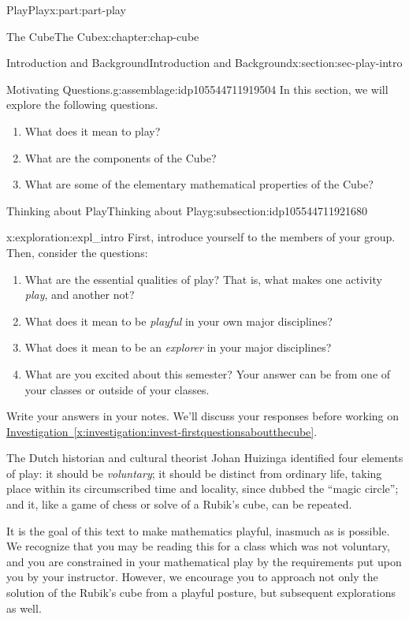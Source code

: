 \documentclass[oneside,10pt,]{book}
\newcommand{\xreffont}{\relax}
\numberwithin{equation}{section}
\begin{document}
\begin{partptx}{Play}{}{Play}{}{}{x:part:part-play}
\begin{chapterptx}{The Cube}{}{The Cube}{}{}{x:chapter:chap-cube}
\begin{sectionptx}{Introduction and Background}{}{Introduction and Background}{}{}{x:section:sec-play-intro}
\begin{introduction}{}
\begin{assemblage}{Motivating Questions.}{g:assemblage:idp105544711919504}%
In this section, we will explore the following questions. %
\begin{enumerate}
\item{}What does it mean to play?%
\item{}What are the components of the Cube?%
\item{}What are some of the elementary mathematical properties of the Cube?%
\end{enumerate}
%
\end{assemblage}
\end{introduction}%
%
%
\typeout{************************************************}
\typeout{************************************************}
%
\begin{subsectionptx}{Thinking about Play}{}{Thinking about Play}{}{}{g:subsection:idp105544711921680}
\begin{exploration}{}{x:exploration:expl_intro}%
First, introduce yourself to the members of your group. Then, consider the questions: %
\begin{enumerate}
\item{}What are the essential qualities of play? That is, what makes one activity \emph{play}, and another not?%
\item{}What does it mean to be \emph{playful} in your own major disciplines?%
\item{}What does it mean to be an \emph{explorer} in your major disciplines?%
\item{}What are you excited about this semester? Your answer can be from one of your classes or outside of your classes.%
\end{enumerate}
 Write your answers in your notes. We'll discuss your responses before working on \hyperref[x:investigation:invest-firstquestionsaboutthecube]{Investigation~{\xreffont\ref{x:investigation:invest-firstquestionsaboutthecube}}}.%
\end{exploration}%
The Dutch historian and cultural theorist Johan Huizinga identified four elements of play: it should be \emph{voluntary}; it should be distinct from ordinary life, taking place within its circumscribed time and locality, since dubbed the ``magic circle''; and it, like a game of chess or solve of a Rubik's cube, can be repeated.%
\par
It is the goal of this text to make mathematics playful, inasmuch as is possible. We recognize that you may be reading this for a class which was not voluntary, and you are constrained in your mathematical play by the requirements put upon you by your instructor. However, we encourage you to approach not only the solution of the Rubik's cube from a playful posture, but subsequent explorations as well.%

\end{subsectionptx}
\end{sectionptx}
\end{chapterptx}
\end{partptx}
\end{document}
